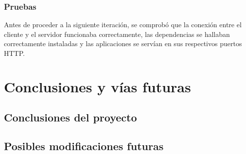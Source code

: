 \documentclass[10pt, a4paper]{aqademic}
\begin{document}
\subsection{Pruebas}

Antes de proceder a la siguiente iteración, se comprobó que la conexión entre el cliente y el servidor funcionaba correctamente, las dependencias se hallaban correctamente instaladas y las aplicaciones se servían en sus respectivos puertos HTTP.

\chapter{Conclusiones y vías futuras}

\section{Conclusiones del proyecto}

\section{Posibles modificaciones futuras}

\newpage



\end{document}
